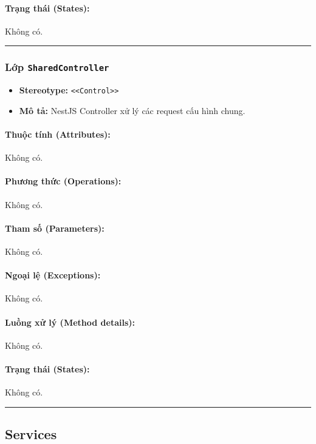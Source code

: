 \documentclass[12pt,a4paper]{article}
\begin{document}
\paragraph{Trạng thái (States):}
Không có.

\vskip 0.5cm
\noindent\rule{\textwidth}{0.5pt}
\vskip 0.5cm

\subsubsection{Lớp \texttt{SharedController}}

\begin{itemize}[leftmargin=*]
    \item \textbf{Stereotype:} \texttt{\textless{}\textless{}Control\textgreater{}\textgreater{}}
    \item \textbf{Mô tả:} NestJS Controller xử lý các request cấu hình chung.
\end{itemize}

\paragraph{Thuộc tính (Attributes):}
Không có.

\paragraph{Phương thức (Operations):}
Không có.

\paragraph{Tham số (Parameters):}
Không có.

\paragraph{Ngoại lệ (Exceptions):}
Không có.

\paragraph{Luồng xử lý (Method details):}
Không có.

\paragraph{Trạng thái (States):}
Không có.

\vskip 0.5cm
\noindent\rule{\textwidth}{0.5pt}
\vskip 0.5cm

\subsection{Services}
\end{document}
